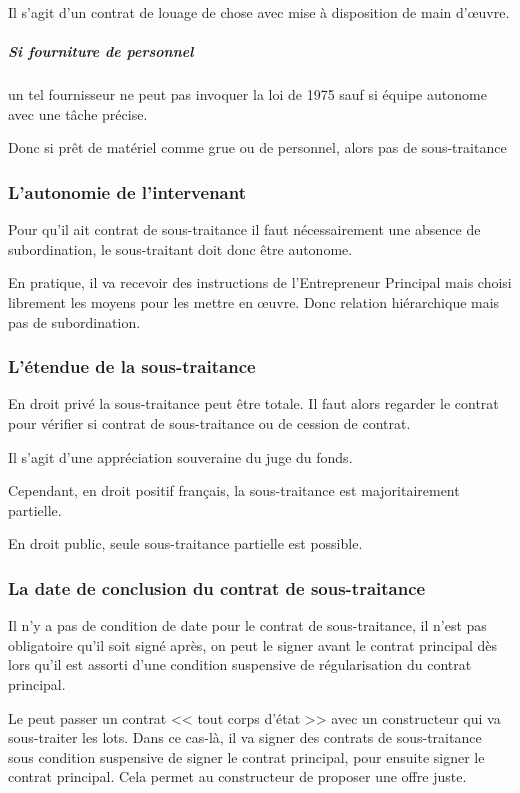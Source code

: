 				Il s’agit d’un contrat de louage de chose avec mise à disposition de main d’œuvre.


				\subparagraph{Si fourniture de personnel} un tel fournisseur ne peut pas invoquer la loi de 1975 sauf si équipe autonome avec une tâche précise.


				Donc si prêt de matériel comme grue ou de personnel, alors pas de sous-traitance



		\subsubsection{L'autonomie de l'intervenant}

			Pour qu’il ait contrat de sous-traitance il faut nécessairement une absence de subordination, le sous-traitant doit donc être autonome.


			En pratique, il va recevoir des instructions de l’Entrepreneur Principal mais choisi librement les moyens pour les mettre en œuvre. Donc relation hiérarchique mais pas de subordination.


		\subsubsection{L'étendue de la sous-traitance}


			En droit privé la sous-traitance peut être totale. Il faut alors regarder le contrat pour vérifier si contrat de sous-traitance ou de cession de contrat.

			Il s'agit d'une appréciation souveraine du juge du fonds.

			Cependant, en droit positif français, la sous-traitance est majoritairement partielle.


			En droit public, seule sous-traitance partielle est possible.



		\subsubsection{La date de conclusion du contrat de sous-traitance}

			Il n’y a pas de condition de date pour le contrat de sous-traitance, il n’est pas obligatoire qu’il soit signé après, on peut le signer avant le contrat principal dès lors qu’il est assorti d’une condition suspensive de régularisation du contrat principal.

			Le \Mo peut passer un contrat << tout corps d’état >> avec un constructeur qui va sous-traiter les lots. Dans ce cas-là, il va signer des contrats de sous-traitance sous condition suspensive de signer le contrat principal, pour ensuite signer le contrat principal.
Cela permet au constructeur de proposer une offre juste.


